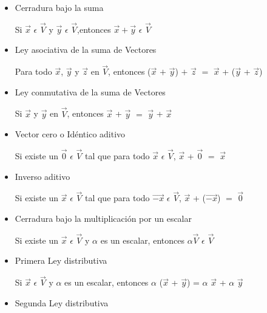 \documentclass[12pt,openany]{book}
\begin{document}
		    \begin{itemize}
	      
		        \item Cerradura bajo la suma
		      
		         Si $\vec{x}$ $\epsilon$ $\vec{V}$ y 
		         $\vec{y}$ $\epsilon$ $\vec{V}$,entonces 
		         $\vec{x} + \vec{y}$ $\epsilon$ $\vec{V}$
		         
		        \item Ley asociativa de la suma de Vectores
		        
		         Para todo $\vec{x}$, $\vec{y}$ y $\vec{z}$ 
		         en $\vec{V}$, entonces ($\vec{x}$ $+$ $\vec{y}$) 
		         $+$ $\vec{z}$ $=$ $\vec{x}$ + ($\vec{y}$ + 
		         $\vec{z}$)
		         
		        \item Ley conmutativa de la suma de Vectores
		        
		         Si $\vec{x}$ y $\vec{y}$ en 
		         $\vec{V}$, entonces $\vec{x}$ + $\vec{y}$ 
		         $=$ $\vec{y}$ + $\vec{x}$ 
		         
		        \item Vector cero o Id\'entico aditivo
		        
		        Si existe un $\vec{0}$ $\epsilon$ $\vec{V}$ tal que
		        para todo $\vec{x}$ $\epsilon$ $\vec{V}$,
		        $\vec{x}$ + $\vec{0}$ $=$  $\vec{x}$
		        
		        \item  Inverso aditivo
		        
		        Si existe un $\vec{x}$ $\epsilon$ $\vec{V}$ tal 
		        que para todo $\vec{-x}$ $\epsilon$ $\vec{V}$,
		         $\vec{x}$ + ($\vec{-x}$) $=$  $\vec{0}$
		        
		        \item Cerradura bajo la multiplicaci\'on por un escalar
		        
		        Si existe un $\vec{x}$ $\epsilon$ $\vec{V}$ y 
		        $\alpha$ es un escalar, entonces $\alpha\vec{V}$ $\epsilon$
		         $\vec{V}$
		        
		        \item Primera Ley distributiva
		        
		        Si $\vec{x}$ $\epsilon$ $\vec{V}$ y $\alpha$ es 
		        un escalar, entonces $\alpha$ ($\vec{x}$ + $\vec{y}$)
		        = $\alpha$ $\vec{x}$ + $\alpha$ $\vec{y}$
		        
		        \item Segunda Ley distributiva
		        

\end{itemize}
\end{document}
